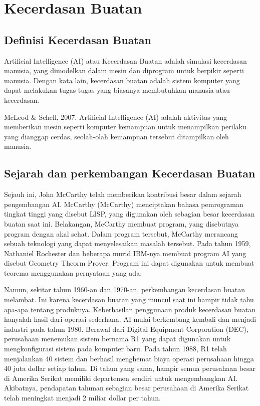 \section{Kecerdasan Buatan}
\subsection{Definisi Kecerdasan Buatan}
 \hspace{1cm} Artificial Intelligence (AI) atau Kecerdasan Buatan adalah simulasi kecerdasan manusia, yang dimodelkan dalam mesin dan diprogram untuk berpikir seperti manusia. Dengan kata lain, kecerdasan buatan adalah sistem komputer yang dapat melakukan tugas-tugas yang biasanya membutuhkan manusia atau kecerdasan.
 
\hspace{1cm} McLeod & Schell, 2007. Artificial Intelligence (AI) adalah aktivitas yang memberikan mesin seperti komputer kemampuan untuk menampilkan perilaku yang dianggap cerdas, seolah-olah kemampuan tersebut ditampilkan oleh manusia.

\subsection{Sejarah dan perkembangan Kecerdasan Buatan}
\hspace{1cm}Sejauh ini, John McCarthy telah memberikan kontribusi besar dalam sejarah pengembangan AI. McCarthy (McCarthy) menciptakan bahasa pemrograman tingkat tinggi yang disebut LISP, yang digunakan oleh sebagian besar kecerdasan buatan saat ini. Belakangan, McCarthy membuat program, yang disebutnya program dengan akal sehat. Dalam program tersebut, McCarthy merancang sebuah teknologi yang dapat menyelesaikan masalah tersebut. Pada tahun 1959, Nathaniel Rochester dan beberapa murid IBM-nya membuat program AI yang disebut Geometry Theorm Prover. Program ini dapat digunakan untuk membuat teorema menggunakan pernyataan yang ada.


\hspace{1cm} Namun, sekitar tahun 1960-an dan 1970-an, perkembangan kecerdasan buatan melambat. Ini karena kecerdasan buatan yang muncul saat ini hampir tidak tahu apa-apa tentang produknya. Keberhasilan penggunaan produk kecerdasan buatan hanyalah hasil dari operasi sederhana. AI mulai berkembang kembali dan menjadi industri pada tahun 1980. Berawal dari Digital Equipment Corporation (DEC), perusahaan menemukan sistem bernama R1 yang dapat digunakan untuk mengkonfigurasi sistem pada komputer baru. Pada tahun 1988, R1 telah menjalankan 40 sistem dan berhasil menghemat biaya operasi perusahaan hingga 40 juta dollar setiap tahun. Di tahun yang sama, hampir semua perusahaan besar di Amerika Serikat memiliki departemen sendiri untuk mengembangkan AI. Akibatnya, pendapatan tahunan sebagian besar perusahaan di Amerika Serikat telah meningkat menjadi 2 miliar dollar per tahun.

